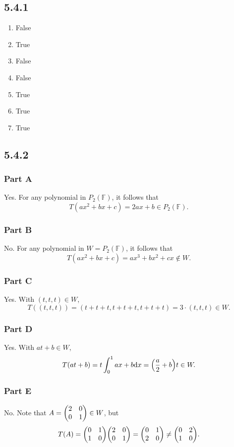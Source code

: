 \documentclass[12pt,titlepage]{extarticle}
\begin{document}
\subsection*{5.4.1}
\begin{enumerate}[label=\alph*)]
    \item False
    \item True
    \item False
    \item False
    \item True
    \item True
    \item True
\end{enumerate}

\subsection*{5.4.2}
\subsubsection*{Part A}
Yes. For any polynomial in $P_2(\mathbb{F})$, it follows that
\[
    T(ax^2 + bx + c) = 2ax + b \in P_2(\mathbb{F})
.\]

\subsubsection*{Part B}
No. For any polynomial in $W = P_2(\mathbb{F})$, it follows that
\[
    T(ax^2 + bx + c) = ax^3 + bx^2 + cx \notin W
.\]

\subsubsection*{Part C}
Yes. With $(t,t,t) \in W$,
\[
    T((t,t,t)) = (t+t+t, t+t+t, t+t+t) = 3\cdot (t,t,t) \in W
.\]

\subsubsection*{Part D}
Yes. With $at + b \in W$,
\[
    T(at+b) = t\int_{0}^1 ax + b \dd x = \qty(\frac{a}{2} + b) t \in W
.\]

\subsubsection*{Part E}
No. Note that $A = \mqty(2 & 0 \\ 0 & 1) \in W$, but
\[
    T(A) = \mqty(
    0 & 1 \\
    1 & 0
    )
    \mqty(
    2 & 0 \\
    0 & 1
    ) = \mqty(
    0 & 1 \\
    2 & 0 
    ) \neq \mqty(
    0 & 2 \\
    1 & 0
    )
.\]
\end{document}
